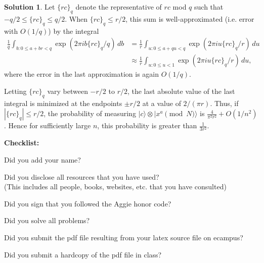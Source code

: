 \documentclass{article}
\theoremstyle{definition}
\newtheorem*{solution}{Solution}
\newcommand{\ket}[1]{|#1\rangle}
\newcommand{\checklist}{\noindent\textbf{Checklist:}
\begin{compactitem}[$\Box$] 
\item Did you add your name? 
\item Did you disclose all resources that you have used? \\
(This includes all people, books, websites, etc. that you have consulted)
\item Did you sign that you followed the Aggie honor code? 
\item Did you solve all problems? 
\item Did you submit the pdf file resulting from your latex source
  file on ecampus? 
\item Did you submit a hardcopy of the pdf file in class? 
\end{compactitem}
}
\begin{document}
\begin{solution}
\newcommand{\rcq}{\{rc\}_q}

Let $\rcq$ denote the representative of $rc$ mod $q$ such that $-q/2 \le \rcq \le q/2$.  When $\rcq \le r/2$,
 this sum is well-approximated (i.e. error with $O(1/q)$) by the integral
\begin{align*}
\frac{1}{q} \int_{b:0 \le a + br < q}  \exp(2\pi i  b \rcq /q) \, db & = \frac{1}{r} \int_{u:0 \le a + qu < q}  \exp(2\pi i u \rcq /r) \, du \\
 & \approx \frac{1}{r} \int_{u:0 \le u < 1}  \exp(2\pi i  u \rcq /r) \, du,
\end{align*}
where the error in the last approximation is again $O(1/q)$.

Letting $\rcq$ vary between $-r/2$ to $r/2$, the last absolute value of the last integral is minimized at the endpoints $\pm r/2$ at 
a value of $2/(\pi r)$.  Thus, if $|\rcq| \le r/2$, the probability of measuring $\ket{c} \otimes \ket{x^a \pmod N}$ is 
$\frac{4}{\pi^2 r^2} + O(1/n^2)$.  Hence for sufficiently large $n$, this probability is greater than $\frac{1}{3r^2}$.
\end{solution}




\goodbreak
\checklist
\end{document}
